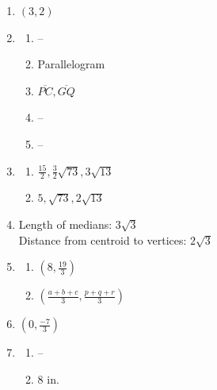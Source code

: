 \documentclass{article}
\begin{document}
\begin{enumerate}
\item $(3, 2)$

\item

	\begin{enumerate}
	
	\item --
	
	\item Parallelogram
	
	\item $\overline{PC}, \overline{GQ}$
	
	\item --
	
	\item --
	
	\end{enumerate}
	
\item

	\begin{enumerate}
	
	\item $\frac{15}{2}, \frac{3}{2}\sqrt{73}, 3\sqrt{13}$
	
	\item $5, \sqrt{73}, 2\sqrt{13}$
	
	\end{enumerate}
	
\item Length of medians: $3\sqrt{3}$ \\
	Distance from centroid to vertices: $2\sqrt{3}$
	
\item

	\begin{enumerate}
	
	\item $(8, \frac{19}{3})$
	
	\item$(\frac{a + b + c}{3}, \frac{p + q + r}{3})$
	
	\end{enumerate}
	
\item $(0, \frac{-7}{3})$

\item

	\begin{enumerate}
	
	\item --
	
	\item 8 in.
	

\end{enumerate}
\end{enumerate}
\end{document}
